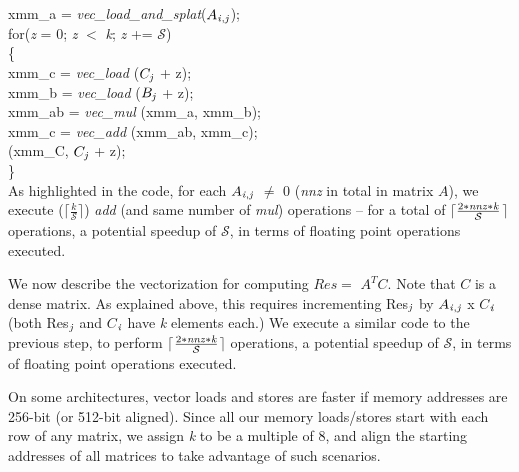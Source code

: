      \hspace*{-0.0in}xmm\_a = {\it{vec\_load\_and\_splat}}($A_{{\it{i}},{\it{j}}}$); \\
     for\hspace*{0.02in}({\it{z}} = 0; {\it{z}} $<$ {\it{k}}; {\it{z}} += $\mathcal{S}$)\\
     \{\\
         \hspace*{0.2in}xmm\_c = {\it{vec\_load}}  ($C_{{\it{j}}}$ + z); \\
         \hspace*{0.2in}xmm\_b = {\it{vec\_load}}  ($B_{{\it{j}}}$ + z); \\
         \hspace*{0.2in}xmm\_ab = {\it{vec\_mul}}  (xmm\_a, xmm\_b); \\
         \hspace*{0.2in}xmm\_c = {\it{vec\_add}}  (xmm\_ab, xmm\_c); \\
          (xmm\_C,  $C_{{\it{j}}}$ + z); \\
     \}\\

     As highlighted in the code, for each
     $A_{{\it{i}},{\it{j}}}$ $\neq$ 0 ({\it{nnz}} in total in matrix $A$), 
     we execute ($\lceil$$\frac{k}{\mathcal{S}}$$\rceil$) 
     {\it{add}} (and same number of {\it{mul}}) operations -- for a
     total of
     $\lceil$$\frac{2*{\it{nnz}}*{\it{k}}}{\mathcal{S}}$$\rceil$ operations,
     a potential speedup of $\mathcal{S}$,  
     in terms of floating point operations executed.

     We now describe the vectorization for computing $Res =$ $A^TC$.
     Note that $C$ is a dense matrix. As explained above, this
     requires incrementing Res$_{{\it{j}}}$ 
     by $A_{{\it{i}},{\it{j}}}$ x $C$$_{{\it{i}}}$ 
     (both Res$_{{\it{j}}}$ and $C$$_{{\it{i}}}$ have {\it{k}} elements each.)
    We execute a similar code to the previous step, to perform 
    $\lceil$$\frac{2*{\it{nnz}}*{\it{k}}}{\mathcal{S}}$$\rceil$
    operations,
    a potential speedup of $\mathcal{S}$,
    in terms of floating point operations executed.

    On some architectures, vector loads and stores are faster if
    memory addresses are 256-bit (or 512-bit aligned). 
    Since all our memory loads/stores start with each row of any
    matrix, we assign {\it{k}}  to be a multiple of 8, and align the
    starting addresses of all matrices to take advantage of such
    scenarios.
    

